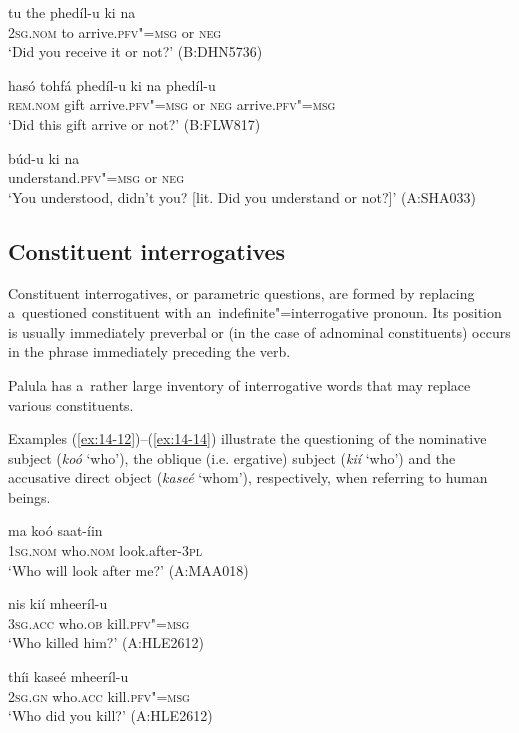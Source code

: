 \begin{exe}
\ex
\label{ex:14-9}
\gll tu the phedíl-u ki na \\
\textsc{2sg.nom} to arrive.\textsc{pfv"=msg} or \textsc{neg} \\
\glt `Did you receive it or not?' (B:DHN5736)

\ex
\label{ex:14-10}
\gll hasó tohfá phedíl-u ki na phedíl-u  \\
\textsc{rem.nom} gift arrive.\textsc{pfv"=msg} or \textsc{neg}  arrive.\textsc{pfv"=msg} \\
\glt `Did this gift arrive or not?' (B:FLW817)

\ex
\label{ex:14-11}
\gll búd-u ki na \\
understand.\textsc{pfv"=msg} or \textsc{neg} \\
\glt `You understood, didn't you? [lit. Did you understand or not?]' (A:SHA033)
\end{exe}
\subsection{Constituent interrogatives}
\label{subsec:14-2-2}

Constituent interrogatives, or parametric questions, are formed by replacing a~questioned constituent with an~indefinite"=interrogative pronoun. Its position is usually immediately preverbal or (in the case of adnominal constituents) occurs in the phrase immediately preceding the verb.


Palula has a~rather large inventory of interrogative words that may replace various constituents.


 Examples (\ref{ex:14-12})--(\ref{ex:14-14}) illustrate the questioning of the nominative subject (\textit{koó} `who'), the oblique (i.e. ergative) subject (\textit{kií} `who') and the accusative direct object (\textit{kaseé} `whom'), respectively, when referring to human beings.

\begin{exe}
\ex
\label{ex:14-12}
\gll ma koó saat-íin \\
\textsc{1sg}.\textsc{nom} who.\textsc{nom} look.after-\textsc{3pl} \\
\glt `Who will look after me?' (A:MAA018)

\ex
\label{ex:14-13}
\gll nis kií mheeríl-u \\
\textsc{3sg.acc} who.\textsc{ob} kill.\textsc{pfv"=msg} \\
\glt `Who killed him?' (A:HLE2612)

\ex
\label{ex:14-14}
\gll thíi kaseé mheeríl-u \\
\textsc{2sg.gn} who.\textsc{acc} kill.\textsc{pfv"=msg} \\
\glt `Who did you kill?' (A:HLE2612)
\end{exe}

